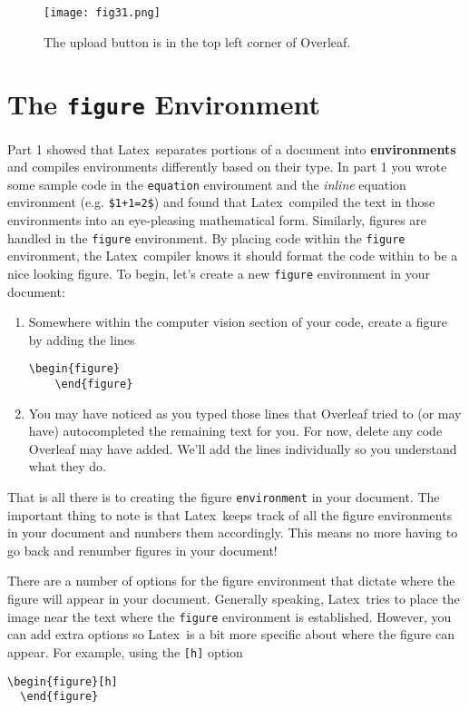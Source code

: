 \documentclass[10pt]{article}
\renewcommand{\LaTeX}{Latex}
\begin{document}
\begin{figure}
\begin{center}
\texttt{[image: fig31.png]}
\end{center}
  \caption{The upload button is in the top left corner of Overleaf.}
  \label{fig:1}
\end{figure}






\section{The \lstinline{figure} Environment}
Part 1 showed that \LaTeX\ separates portions of a document into \textbf{environments} and compiles environments differently based on their type. In part 1 you wrote some sample code in the \lstinline{equation} environment and the \emph{inline} equation environment (e.g. \lstinline{$1+1=2$}) and found that \LaTeX\ compiled the text in those environments into an eye-pleasing mathematical form. Similarly, figures are handled in the \lstinline{figure} environment. By placing code within the \lstinline{figure} environment, the \LaTeX\ compiler knows it should format the code within to be a nice looking figure. To begin, let’s create a new \lstinline{figure} environment in your document:
\begin{enumerate}
\item Somewhere within the computer vision section of your code, create a figure by adding the lines
  \begin{lstlisting}[basicstyle=\ttfamily\footnotesize]
    \begin{figure}
    \end{figure}
  \end{lstlisting}
  
\item You may have noticed as you typed those lines that Overleaf tried to (or may have) autocompleted the remaining text for you. For now, delete any code Overleaf may have added. We’ll add the lines individually so you understand what they do.
\end{enumerate}
  
That is all there is to creating the figure \lstinline{environment} in your document. The important thing to note is that \LaTeX\ keeps track of all the figure environments in your document and numbers them accordingly. This means no more having to go back and renumber figures in your document!

There are a number of options for the figure environment that dictate where the figure will appear in your document. Generally speaking, \LaTeX\ tries to place the image near the text where the \lstinline{figure} environment is established. However, you can add extra options so \LaTeX\ is a bit more specific about where the figure can appear. For example, using the \lstinline{[h]} option
\begin{lstlisting}[basicstyle=\ttfamily\footnotesize]
  \begin{figure}[h]
  \end{figure}
\end{lstlisting}
  
\end{document}
